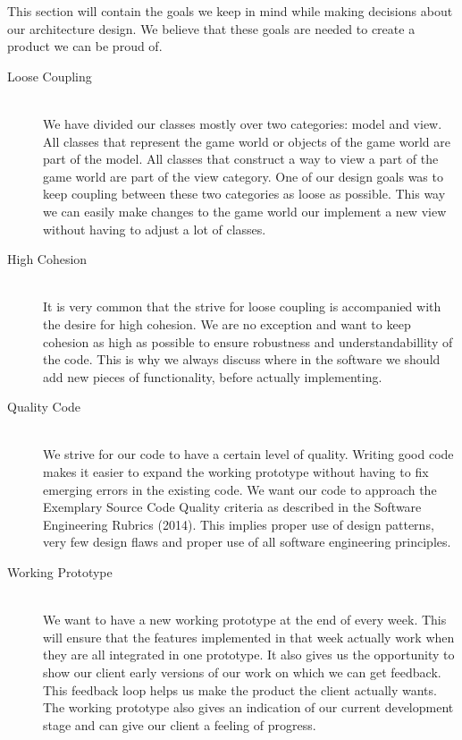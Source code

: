 This section will contain the goals we keep in mind while making decisions about our architecture design. We believe that these goals are needed to create a product we can be proud of.




\begin{description}

\item[Loose Coupling]  \hfill \\


We have divided our classes mostly over two categories: model and view. All classes that represent the game world or objects of the game world are part of the model. All classes that construct a way to view a part of the game world are part of the view category. One of our design goals was to keep coupling between these two categories as loose as possible. This way we can easily make changes to the game world our implement a new view without having to adjust a lot of classes.

\item[High Cohesion]  \hfill \\

It is very common that the strive for loose coupling is accompanied with the desire for high cohesion. We are no exception and want to keep cohesion as high as possible to ensure robustness and understandabillity of the code. This is why we always discuss  where in the software we should add new pieces of functionality, before actually implementing.

\item[Quality Code]  \hfill \\


We strive for our code to have a certain level of quality. Writing good code makes it easier to expand the working prototype without having to fix emerging errors in the existing code. We want our code to approach the Exemplary Source Code Quality criteria as described in the Software Engineering Rubrics (2014).  This implies proper use of design patterns, very few design flaws and proper use of all software engineering principles. 


\item[Working Prototype]  \hfill \\

We want to have a new working prototype at the end of every week. This will ensure that the features implemented in that week actually work when they are all integrated in one prototype. It also gives us the opportunity to show our client early versions of our work on which we can get feedback. This feedback loop helps us make the product the client actually wants. The  working prototype also gives an indication of our current development stage and can give our client a feeling of progress.

\end{description}